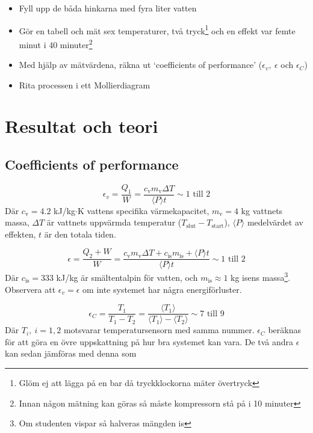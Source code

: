 \documentclass[11pt]{article}
\begin{document}
\begin{itemize}
    \item Fyll upp de båda hinkarna med fyra liter vatten
    \item Gör en tabell och mät sex temperaturer, två tryck\footnote{Glöm ej att lägga på en bar då tryckklockorna mäter övertryck} och en effekt var femte minut i 40 minuter\footnote{Innan någon mätning kan göras så måste kompressorn stå på i 10 minuter}
    \item Med hjälp av mätvärdena, räkna ut `coefficients of performance' ($\epsilon_v, \ \epsilon$ och $\epsilon_C$)
    \item Rita processen i ett Mollierdiagram
\end{itemize}

\section{Resultat och teori}

\subsection{Coefficients of performance}

\begin{equation}
    \epsilon_v = \frac{Q_1}{W} = \frac{c_{\text{v}} m_{\text{v}} \Delta T}{\langle P \rangle t} \sim 1 \text{ till } 2
\end{equation}
Där $c_{\text{v}} = 4.2$ kJ/kg$\cdot$K vattens specifika värmekapacitet, $m_{\text{v}} = 4$ kg vattnets massa, $\Delta T$ är vattnets uppvärmda temperatur ($T_{\text{slut}} -T_{\text{start}}$), $\langle P \rangle$ medelvärdet av effekten, $t$ är den totala tiden.

\begin{equation}
    \epsilon = \frac{Q_2 + W}{W} = \frac{c_{\text{v}} m_{\text{v}} \Delta T + c_{\text{is}} m_{\text{is}} + \langle P \rangle t}{\langle P \rangle t} \sim 1 \text{ till } 2
\end{equation}
Där $c_{\text{is}} = 333$ kJ/kg är smältentalpin för vatten, och $m_{\text{is}} \approx 1$ kg isens massa\footnote{Om studenten vispar så halveras mängden is}. Observera att $\epsilon_v = \epsilon$ om inte systemet har några energiförluster.

\begin{equation}
    \epsilon_C = \frac{T_1}{T_1 - T_2} = \frac{\langle T_1 \rangle}{\langle T_1 \rangle - \langle T_2 \rangle} \sim 7 \text{ till } 9
\end{equation}
Där $T_i, \ i = 1, 2$ motsvarar temperatursensorn med samma nummer. $\epsilon_C$ beräknas för att göra en övre uppskattning på hur bra systemet kan vara. De två andra $\epsilon$ kan sedan jämföras med denna som
\end{document}
